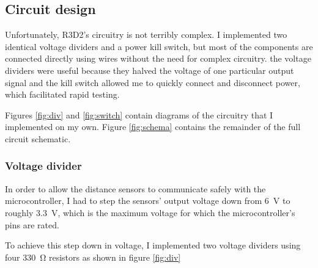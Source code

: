 \documentclass{article}
\begin{document}
\subsection{Circuit design}

Unfortunately, R3D2's circuitry is not terribly complex. I implemented two
identical voltage dividers and a power kill switch, but most of the components
are connected directly using wires without the need for complex circuitry. the voltage dividers were useful because they halved the voltage of one particular
output signal and the kill switch allowed me to quickly connect and disconnect
power, which facilitated rapid testing.

Figures \ref{fig:div} and \ref{fig:switch} contain diagrams of the circuitry
that I implemented on my own. Figure \ref{fig:schema} contains the remainder
of the full circuit schematic.

\subsubsection{Voltage divider}

In order to allow the distance sensors to communicate safely with the
microcontroller, I had to step the sensors' output voltage down from
\SI{6}{\volt} to roughly \SI{3.3}{\volt}, which is the maximum voltage for
which the microcontroller's pins are rated.

To achieve this step down in voltage, I implemented two voltage dividers using
four \SI{330}{\ohm} resistors as shown in figure \ref{fig:div}
\end{document}
